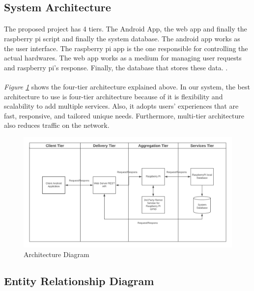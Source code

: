 \documentclass[12pt]{paper}
\begin{document}
	\subsection{System Architecture}
	\paragraph{} The proposed project has 4 tiers. The Android App, the web app and finally the raspberry pi script and finally the system database. The android app works as the user interface. The raspberry pi app is the one responsible for controlling the actual hardwares. The web app  works as a medium for managing user requests and raspberry pi's response. Finally, the database that stores these data.
.
	\paragraph{} \textit{Figure \ref{fig:diagram_architecture}} shows the four-tier architecture explained above. In our system, the best architecture to use is four-tier architecture because of it is flexibility and scalability to add multiple services. Also, it adopts users’ experiences that are fast, responsive, and tailored unique needs. Furthermore, multi-tier architecture also reduces traffic on the network\cite{architecture}.
	\begin{figure}[H]
		\centering
		\includegraphics[width=\linewidth]{img/diagram_architecture.png}
		\caption{Architecture Diagram}
		\label{fig:diagram_architecture}
	\end{figure}

	
	\newpage\subsection{Entity Relationship Diagram}
	
\end{document}
